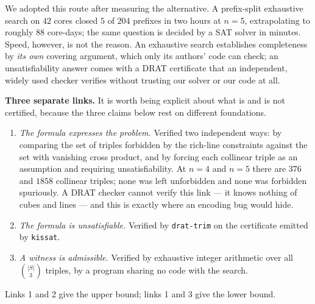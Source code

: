 \documentclass[11pt,a4paper]{article}
\begin{document}
We adopted this route after measuring the alternative.  A prefix-split exhaustive search on $42$ cores closed
$5$ of $204$ prefixes in two hours at $n=5$, extrapolating to roughly $88$ core-days; the same question is
decided by a SAT solver in minutes.  Speed, however, is not the reason.  An exhaustive search establishes
completeness by \emph{its own} covering argument, which only its authors' code can check; an unsatisfiability
answer comes with a DRAT certificate that an independent, widely used checker verifies without trusting our
solver or our code at all.

\medskip\noindent\textbf{Three separate links.}  It is worth being explicit about what is and is not certified,
because the three claims below rest on different foundations.
\begin{enumerate}\itemsep2pt
\item \emph{The formula expresses the problem.}  Verified two independent ways: by comparing the set of
triples forbidden by the rich-line constraints against the set with vanishing cross product, and by forcing each
collinear triple as an assumption and requiring unsatisfiability.  At $n=4$ and $n=5$ there are $376$ and $1858$
collinear triples; none was left unforbidden and none was forbidden spuriously.  A DRAT checker cannot verify
this link --- it knows nothing of cubes and lines --- and this is exactly where an encoding bug would hide.
\item \emph{The formula is unsatisfiable.}  Verified by \texttt{drat-trim} on the certificate emitted by
\texttt{kissat}.
\item \emph{A witness is admissible.}  Verified by exhaustive integer arithmetic over all $\binom{|S|}{3}$
triples, by a program sharing no code with the search.
\end{enumerate}
Links 1 and 2 give the upper bound; links 1 and 3 give the lower bound.
\end{document}
